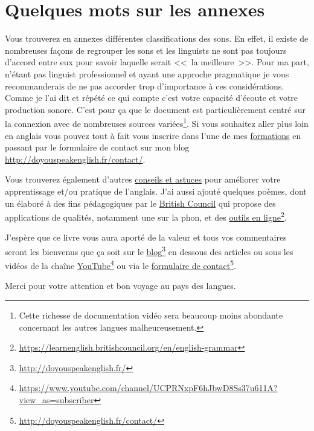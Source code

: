 \chapter{Quelques mots sur les annexes}\label{chap:mots-annex}

Vous trouverez en annexes différentes classifications des sons. En
effet, il existe de nombreuses façons de regrouper les sons et les
\glspl{linguist} ne sont pas toujours d'accord entre eux pour savoir
laquelle serait <<~la meilleure~>>. Pour ma part, n'étant pas
\gls{linguist} professionnel et ayant une approche pragmatique je vous
recommanderais de ne pas accorder trop d'importance à ces
considérations. Comme je l'ai dit et répété ce qui compte c'est votre
capacité d'écoute et votre production sonore. C'est pour ça que le
document est particulièrement centré sur la connexion avec de
nombreuses sources variées\footnote{Cette richesse de documentation
  vidéo sera beaucoup moins abondante concernant les autres
  langues malheureusement.}.
Si vous souhaitez aller plus loin en anglais vous pouvez tout à fait
vous inscrire dans l'une de mes \href{https://www.youtube.com/playlist?list=PLfKvL-VUSKAnw4d6mEbtHxQH1kuqyClHD}{formations} en passant par le
formulaire de contact sur mon blog
\url{http://doyouspeakenglish.fr/contact/}.

Vous trouverez également d'autres \href{https://www.youtube.com/playlist?list=PLfKvL-VUSKAnf4oZzkI3q24X4FJrGzcGr}{conseils et astuces} pour améliorer
votre apprentissage et/ou pratique de l'anglais. J'ai aussi ajouté
quelques poèmes, dont un élaboré à des fins pédagogiques par le
\href{}{British Council} qui propose des applications de qualités, notamment
une sur la \gls{phon}, et des
\href{https://learnenglish.britishcouncil.org/en/english-grammar}{outils
  en
  ligne}\footnote{\url{https://learnenglish.britishcouncil.org/en/english-grammar}}.

J'espère que ce livre vous aura aporté de la valeur et tous vos
commentaires seront les bienvenus que ça soit sur le \href{http://doyouspeakenglish.fr/}{blog}\footnote{\url{http://doyouspeakenglish.fr/}} en dessous
des articles ou sous les vidéos de la chaîne \href{https://www.youtube.com/channel/UCPRNxpF6hJbwD8Ss37u611A?view_as=subscriber}{YouTube}\footnote{\url{https://www.youtube.com/channel/UCPRNxpF6hJbwD8Ss37u611A?view_as=subscriber}} ou via le
\href{http://doyouspeakenglish.fr/contact/}{formulaire de contact}\footnote{\url{http://doyouspeakenglish.fr/contact/}}.

Merci pour votre attention et bon voyage au pays des langues.
